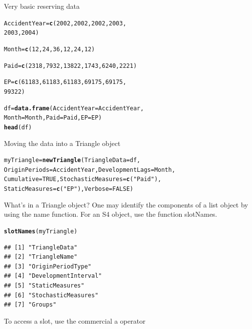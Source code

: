 \documentclass[xcolor=dvipsnames]{beamer}\usepackage{graphicx, color}
\makeatletter
\newcommand{\hlfunctioncall}[1]{\textcolor[rgb]{0.501960784313725,0,0.329411764705882}{\textbf{#1}}}%
\newcommand{\hlstring}[1]{\textcolor[rgb]{0.6,0.6,1}{#1}}%
\newenvironment{kframe}{%
 \def\at@end@of@kframe{}%
 \ifinner\ifhmode%
  \def\at@end@of@kframe{\end{minipage}}%
  \begin{minipage}{\columnwidth}%
 \fi\fi%
 \def\FrameCommand##1{\hskip\@totalleftmargin \hskip-\fboxsep
 \colorbox{shadecolor}{##1}\hskip-\fboxsep
     \hskip-\linewidth \hskip-\@totalleftmargin \hskip\columnwidth}%
 \MakeFramed {\advance\hsize-\width
   \@totalleftmargin\z@ \linewidth\hsize
   \@setminipage}}%
 {\par\unskip\endMakeFramed%
 \at@end@of@kframe}
\newenvironment{knitrout}{}{} %
\makeatother
\begin{document}
\begin{frame}[fragile]{Very basic reserving data}
\begin{knitrout}
\color{fgcolor}\begin{kframe}
\begin{alltt}
AccidentYear = \hlfunctioncall{c}(2002, 2002, 2002, 2003, 
    2003, 2004)

Month = \hlfunctioncall{c}(12, 24, 36, 12, 24, 12)

Paid = \hlfunctioncall{c}(2318, 7932, 13822, 1743, 6240, 2221)

EP = \hlfunctioncall{c}(61183, 61183, 61183, 69175, 69175, 
    99322)

df = \hlfunctioncall{data.frame}(AccidentYear = AccidentYear, 
    Month = Month, Paid = Paid, EP = EP)
\hlfunctioncall{head}(df)
\end{alltt}
\end{kframe}
\end{knitrout}

\end{frame}

\begin{frame}[fragile] {Moving the data into a Triangle object}
\begin{knitrout}
\color{fgcolor}\begin{kframe}
\begin{alltt}
myTriangle = \hlfunctioncall{newTriangle}(TriangleData = df, 
    OriginPeriods = AccidentYear, DevelopmentLags = Month, 
    Cumulative = TRUE, StochasticMeasures = \hlfunctioncall{c}(\hlstring{"Paid"}), 
    StaticMeasures = \hlfunctioncall{c}(\hlstring{"EP"}), Verbose = FALSE)
\end{alltt}
\end{kframe}
\end{knitrout}

\end{frame}

\begin{frame}[fragile]{What's in a Triangle object?}
One may identify the components of a list object by using the name function. For an S4 object, use the function slotNames.
\begin{knitrout}
\color{fgcolor}\begin{kframe}
\begin{alltt}
\hlfunctioncall{slotNames}(myTriangle)
\end{alltt}
\begin{verbatim}
## [1] "TriangleData"       
## [2] "TriangleName"       
## [3] "OriginPeriodType"   
## [4] "DevelopmentInterval"
## [5] "StaticMeasures"     
## [6] "StochasticMeasures" 
## [7] "Groups"
\end{verbatim}
\end{kframe}
\end{knitrout}

To access a slot, use the commercial a operator
\end{frame}
\end{document}
